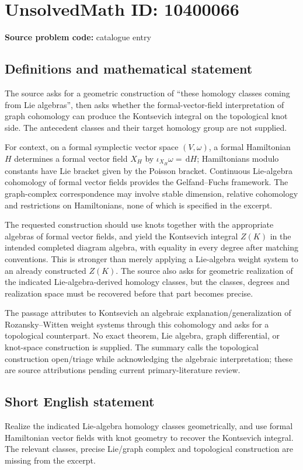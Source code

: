 \documentclass[11pt]{article}
\newcommand{\dd}{\,\mathrm{d}}
\begin{document}
\section*{UnsolvedMath ID: 10400066}
\textbf{Source problem code:} catalogue entry
\subsection{Definitions and mathematical statement}
The source asks for a geometric construction of ``these homology classes coming from Lie algebras'', then asks whether the formal-vector-field interpretation of graph cohomology can produce the Kontsevich integral on the topological knot side. The antecedent classes and their target homology group are not supplied.

For context, on a formal symplectic vector space \((V,\omega)\), a formal Hamiltonian \(H\) determines a formal vector field \(X_H\) by \(\iota_{X_H}\omega=\dd H\); Hamiltonians modulo constants have Lie bracket given by the Poisson bracket. Continuous Lie-algebra cohomology of formal vector fields provides the Gelfand--Fuchs framework. The graph-complex correspondence may involve stable dimension, relative cohomology and restrictions on Hamiltonians, none of which is specified in the excerpt.

The requested construction should use knots together with the appropriate algebras of formal vector fields, and yield the Kontsevich integral \(Z(K)\) in the intended completed diagram algebra, with equality in every degree after matching conventions. This is stronger than merely applying a Lie-algebra weight system to an already constructed \(Z(K)\). The source also asks for geometric realization of the indicated Lie-algebra-derived homology classes, but the classes, degrees and realization space must be recovered before that part becomes precise.

The passage attributes to Kontsevich an algebraic explanation/generalization of Rozansky--Witten weight systems through this cohomology and asks for a topological counterpart. No exact theorem, Lie algebra, graph differential, or knot-space construction is supplied. The summary calls the topological construction open/triage while acknowledging the algebraic interpretation; these are source attributions pending current primary-literature review.
\subsection{Short English statement}
Realize the indicated Lie-algebra homology classes geometrically, and use formal Hamiltonian vector fields with knot geometry to recover the Kontsevich integral. The relevant classes, precise Lie/graph complex and topological construction are missing from the excerpt.
\end{document}
